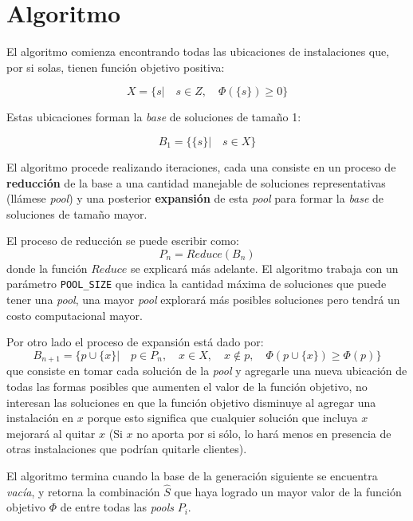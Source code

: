 \section{Algoritmo}

El algoritmo comienza encontrando todas las ubicaciones de instalaciones que, por si solas, tienen función objetivo positiva:

\begin{equation}
X = \{ s |  \quad s \in Z, \quad \Phi(\{s\}) \geq 0 \}
\end{equation}

Estas ubicaciones forman la \emph{base} de soluciones de tamaño 1:

\begin{equation}
B_1 = \{ \{s\} | \quad s \in X \}
\end{equation}

El algoritmo procede realizando iteraciones, cada una consiste en un proceso de \textbf{reducción} de la base a una cantidad manejable de soluciones representativas (llámese \emph{pool}) y una posterior \textbf{expansión} de esta \emph{pool} para formar la \emph{base} de soluciones de tamaño mayor.

El proceso de reducción se puede escribir como:
\begin{equation}
P_n = Reduce(B_n)
\end{equation}
donde la función $Reduce$ se explicará más adelante. El algoritmo trabaja con un parámetro \texttt{POOL\_SIZE} que indica la cantidad máxima de soluciones que puede tener una \emph{pool}, una mayor \emph{pool} explorará más posibles soluciones pero tendrá un costo computacional mayor.

Por otro lado el proceso de expansión está dado por:
\begin{equation}
B_{n+1} = \{p \cup \{x\} |
    \quad p \in P_n, \quad x \in X, \quad x \notin p, \quad \Phi(p \cup \{x\}) \geq \Phi(p) \}
\end{equation}
que consiste en tomar cada solución de la \emph{pool} y agregarle una nueva ubicación de todas las formas posibles que aumenten el valor de la función objetivo, no interesan las soluciones en que la función objetivo disminuye al agregar una instalación en $x$ porque esto significa que cualquier solución que incluya $x$ mejorará al quitar $x$ (Si $x$ no aporta por si sólo, lo hará menos en presencia de otras instalaciones que podrían quitarle clientes).

El algoritmo termina cuando la base de la generación siguiente se encuentra \emph{vacía}, y retorna la combinación $\hat{S}$ que haya logrado un mayor valor de la función objetivo $\Phi$ de entre todas las \emph{pools} $P_i$.
